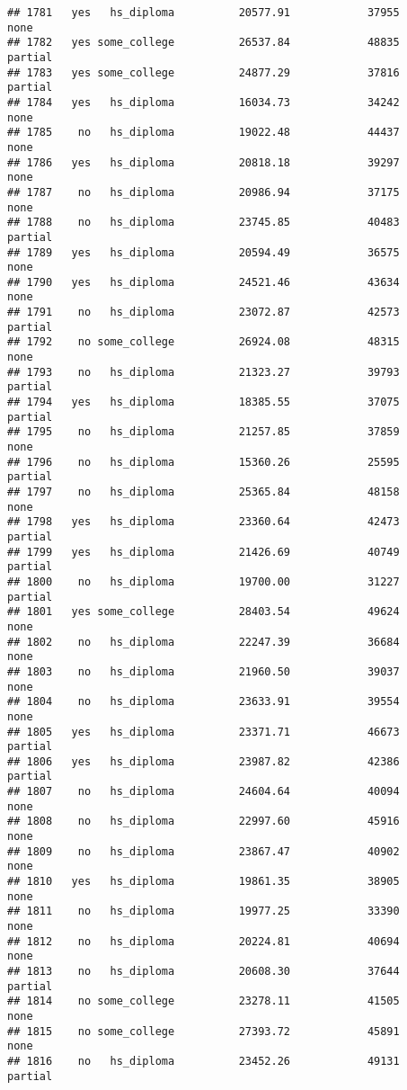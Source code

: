 \documentclass[
]{article}
\begin{document}
\begin{verbatim}
## 1781   yes   hs_diploma          20577.91            37955        none
## 1782   yes some_college          26537.84            48835     partial
## 1783   yes some_college          24877.29            37816     partial
## 1784   yes   hs_diploma          16034.73            34242        none
## 1785    no   hs_diploma          19022.48            44437        none
## 1786   yes   hs_diploma          20818.18            39297        none
## 1787    no   hs_diploma          20986.94            37175        none
## 1788    no   hs_diploma          23745.85            40483     partial
## 1789   yes   hs_diploma          20594.49            36575        none
## 1790   yes   hs_diploma          24521.46            43634        none
## 1791    no   hs_diploma          23072.87            42573     partial
## 1792    no some_college          26924.08            48315        none
## 1793    no   hs_diploma          21323.27            39793     partial
## 1794   yes   hs_diploma          18385.55            37075     partial
## 1795    no   hs_diploma          21257.85            37859        none
## 1796    no   hs_diploma          15360.26            25595     partial
## 1797    no   hs_diploma          25365.84            48158        none
## 1798   yes   hs_diploma          23360.64            42473     partial
## 1799   yes   hs_diploma          21426.69            40749     partial
## 1800    no   hs_diploma          19700.00            31227     partial
## 1801   yes some_college          28403.54            49624        none
## 1802    no   hs_diploma          22247.39            36684        none
## 1803    no   hs_diploma          21960.50            39037        none
## 1804    no   hs_diploma          23633.91            39554        none
## 1805   yes   hs_diploma          23371.71            46673     partial
## 1806   yes   hs_diploma          23987.82            42386     partial
## 1807    no   hs_diploma          24604.64            40094        none
## 1808    no   hs_diploma          22997.60            45916        none
## 1809    no   hs_diploma          23867.47            40902        none
## 1810   yes   hs_diploma          19861.35            38905        none
## 1811    no   hs_diploma          19977.25            33390        none
## 1812    no   hs_diploma          20224.81            40694        none
## 1813    no   hs_diploma          20608.30            37644     partial
## 1814    no some_college          23278.11            41505        none
## 1815    no some_college          27393.72            45891        none
## 1816    no   hs_diploma          23452.26            49131     partial

\end{verbatim}
\end{document}
